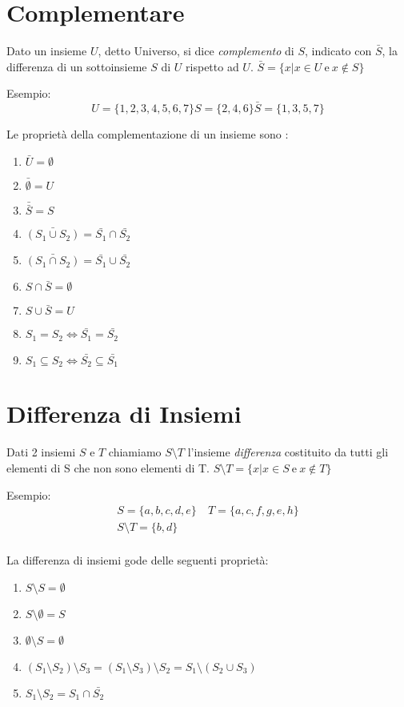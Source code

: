 \section{Complementare}
Dato un insieme $U$, detto Universo, si dice \textit{complemento} di $S$, indicato con $\bar{S}$,
la differenza di un sottoinsieme $S$ di $U$ rispetto ad $U$.\newline
$\bar{S} = \{x | x \in U \ \text{e} \ x \not \in S \} $

Esempio:
\begin{equation*}
U = \{1,2,3,4,5,6,7\}
S = \{2,4,6\}
\bar{S} = \{1,3,5,7\}
\end{equation*}


\begin{prop}
    Le proprietà della complementazione di un insieme sono :
\end{prop}
\begin{enumerate}
  \item $\bar{U} = \emptyset $
  \item $\bar{\emptyset} = U$
  \item $\bar{\bar{S}} = S$
  \item $\bar{(S_1 \cup S_2)} = \bar{S_1} \cap \bar{S_2}$
  \item $\bar{(S_1 \cap S_2)} = \bar{S_1} \cup \bar{S_2}$
  \item $S \cap \bar{S} = \emptyset$
  \item $S \cup \bar{S} = U$
  \item $S_1 = S_2 \iff \bar{S_1} = \bar{S_2}$
  \item $S_1 \subseteq S_2 \iff \bar{S_2} \subseteq \bar{S_1}$
\end{enumerate}

\section{Differenza di Insiemi}
Dati 2 insiemi $S$ e $T$ chiamiamo $S \setminus T$ l'insieme \textit{differenza} costituito
da tutti gli elementi di S che non sono elementi di T. \newline
$S \setminus T = \{x | x \in S \ \text{e} \ x \not \in T\} $

Esempio:
\begin{align*}
S = \{a,b,c,d,e\} & \ T = \{a,c,f,g,e,h\} \\
S \setminus T = \{b,d\} \\
\end{align*}
\begin{prop}
    La differenza di insiemi gode delle seguenti proprietà:
\end{prop}
\begin{enumerate}
  \item $S \setminus S = \emptyset$
  \item $S \setminus \emptyset = S$
  \item $\emptyset \setminus S = \emptyset$
  \item $(S_1 \setminus S_2) \setminus S_3 =
         (S_1 \setminus S_3) \setminus S_2 = S_1 \setminus (S_2 \cup S_3)$
  \item $S_1 \setminus S_2 = S_1 \cap \bar{S_2}$
\end{enumerate}

